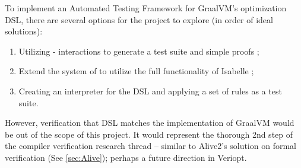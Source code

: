 To implement an Automated Testing Framework for GraalVM's optimization DSL, there are several options for the project to explore 
(in order of ideal solutions):
\begin{enumerate}
    \item Utilizing  -  interactions \cite[Ch. 4]{isabelleSystem} to generate a test suite and simple proofs 
          \cite{isabelleQuickcheck,isabelleProof,isabelleNitpick,isabelleSledgehammer};
    \item Extend the system of  to utilize the full functionality of Isabelle \cite[Ch. 5]{isabelleSystem};
    \item Creating an interpreter for the DSL and applying a set of rules as a test suite.
\end{enumerate}

However, verification that DSL matches the implementation of GraalVM would be out of the scope of this project. It would represent the thorough 
2nd step of the compiler verification research thread \cite[pp. 5]{CompilerOptimization} -- similar to Alive2's \cite{Alive2} solution on formal 
verification (See \ref{sec:Alive}); perhaps a future direction in Veriopt.

